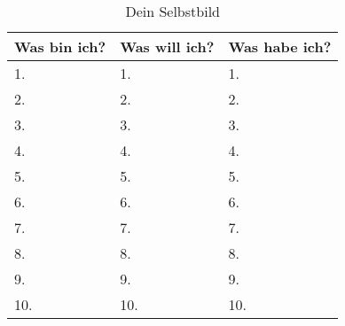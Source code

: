 \documentclass[../Lebensziel.tex]{subfiles}
\begin{document}
\begin{table}[h!]
    \centering
    \setlength{\tabcolsep}{18pt}
    \renewcommand{\arraystretch}{1.5}
    \begin{tabular}{p{3.3cm}|p{3.3cm}|p{3.3cm}}
        \textbf{Was bin ich?} & \textbf{Was will ich?} & \textbf{Was habe ich?} \\\hline
        1.                    & 1.                     & 1.                     \\\hline
        2.                    & 2.                     & 2.                     \\\hline
        3.                    & 3.                     & 3.                     \\\hline
        4.                    & 4.                     & 4.                     \\\hline
        5.                    & 5.                     & 5.                     \\\hline
        6.                    & 6.                     & 6.                     \\\hline
        7.                    & 7.                     & 7.                     \\\hline
        8.                    & 8.                     & 8.                     \\\hline
        9.                    & 9.                     & 9.                     \\\hline
        10.                   & 10.                    & 10.
    \end{tabular}
    \caption{Dein Selbstbild}
    \label{selbstbild}
\end{table}
\end{document}
